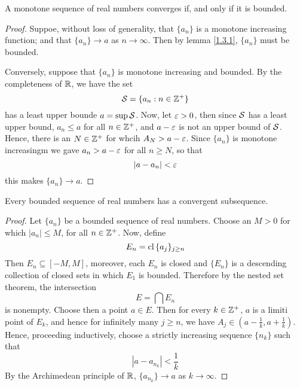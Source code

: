 \begin{theorem}\label{1.3.2}
    A monotone sequence of real numbers converges if, and only if it is bounded.
\end{theorem}
\begin{proof}
    Suppoe, without loss of generality, that $\{a_n\}$ is a monotone increasing
    function; and that $\{a_n\} \xrightarrow{} a$ as $n \xrightarrow{} \infty$.
    Then by lemma \ref{1.3.1}, $\{a_n\}$ must be bounded.

    Conversely, suppose that $\{a_n\}$ is monotone increasing and bounded. By
    the completeness of $\mathbb{R}$, we have the set
    \begin{equation*}
        \mathcal{S}=\{a_n : n \in \mathbb{Z}^+\}
    \end{equation*}
    has a least upper bounde $a=\sup{\mathcal{S}}$. Now, let $\varepsilon>0$, then since  $\mathcal{S}$
    has a least upper bound,  $a_n \leq a$ for all  $n \in \mathbb{Z}^+$, and  $a-\varepsilon$ is
    not an upper bound of  $\mathcal{S}$. Hence, there is an  $N \in \mathbb{Z}^+$ for whcih
    $A_N>a-\varepsilon$. Since  $\{a_n\}$ is monotone increasingm we gave $a_n>a-\varepsilon$ for
    all  $n \geq N$, so that
    \begin{equation*}
        |a-a_n|<\varepsilon
    \end{equation*}
    this makes $\{a_n\} \xrightarrow{} a$.
\end{proof}

\begin{theorem}\label{1.3.3}
    Every bounded sequence of real numbers has a convergent subsequence.
\end{theorem}
\begin{proof}
    Let $\{a_n\}$ be a bounded sequence of real numbers. Choose an $M>0$ for
    which  $|a_n| \leq M$, for all $n \in \mathbb{Z}^+$. Now, define
    \begin{equation*}
        E_n=\operatorname{cl}{\{a_j\}_{j \geq n}}
    \end{equation*}
    Then $E_n \subseteq [-M,M]$, moreover, each $E_n$ is closed and $\{E_n\}$ is a
    descending collection of closed sets in which $E_1$ is bounded. Therefore by
    the nested set theorem, the intersection
    \begin{equation*}
        E=\bigcap{E_n}
    \end{equation*}
    is nonempty. Choose then a point $a \in E$. Then for every  $k \in \mathbb{Z}^+$,
    $a$ is a limiti point of  $E_k$, and hence for infinitely many  $j \geq n$,
    we have  $A_j \in (a-\frac{1}{k},a+\frac{1}{k})$. Hence, proceeding
    inductively, choose a strictly increasing sequence $\{n_k\}$ such that
    \begin{equation*}
        |a-a_{n_k}|<\frac{1}{k}
    \end{equation*}
    By the Archimedean principle of $\mathbb{R}$,  $\{a_{n_k}\} \xrightarrow{} a$ as $k
    \xrightarrow{} \infty$.
\end{proof}

